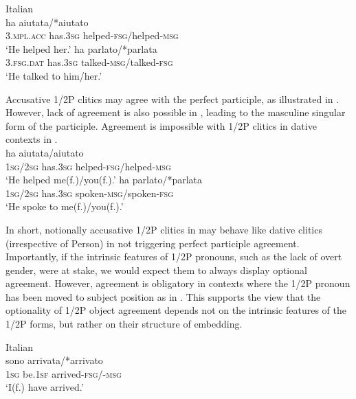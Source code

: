 \documentclass[output=paper,colorlinks,citecolor=brown,nonflat]{./langscibook}
\begin{document}
\ea%
    \label{ex:manzini:14}
    Italian\\
    \ea\label{ex:manzini:14a} 
         {ha}     {aiutata/*aiutato}\\
        \textsc{3.mpl.acc}  has.\textsc{3sg}    helped-\textsc{fsg/}helped\textsc{{}-msg}\\
    \glt ‘He helped her.’
    \ex\label{ex:manzini:14b} 
           {ha}     {parlato/*parlata}\\
        \textsc{3.fsg.dat}  has.\textsc{3sg}    talked-\textsc{msg/}talked\textsc{{}-fsg}\\
    \glt ‘He talked to him/her.’
    \z
\z
 
Accusative 1/2P clitics may agree with the perfect participle, as illustrated in . However, lack of agreement is also possible in , leading to the masculine singular form of the participle. Agreement is impossible with 1/2P clitics in dative contexts in .\\

\ea%
    \label{ex:manzini:15}
    \ea\label{ex:manzini:15a} 
         {ha}     {aiutata/aiutato}\\
        \textsc{1sg/2sg}  has\textsc{.3sg}    helped\textsc{{}-fsg/}helped\textsc{{}-msg}\\
    \glt ‘He helped me(f.)/you(f.).’
\ex\label{ex:manzini:15b} 
            {ha}     {parlato/*parlata}\\
        \textsc{1sg/2sg}  has\textsc{.3sg}    spoken\textsc{{}-msg/}spoken\textsc{{}-fsg}\\
    \glt ‘He spoke to me(f.)/you(f.).’
    \z
\z 

In short, notionally accusative 1/2P clitics in  may behave like dative clitics (irrespective of Person) in not triggering perfect participle agreement. Importantly, if the intrinsic features of 1/2P pronouns, such as the lack of overt gender, were at stake, we would expect them to always display optional agreement. However, agreement is obligatory in contexts where the 1/2P pronoun has been moved to subject position as in . This supports the view that the optionality of 1/2P object agreement depends not on the intrinsic features of the 1/2P forms, but rather on their structure of embedding.

\ea%
    \label{ex:manzini:16}
    Italian\\
      {sono}     {arrivata/*arrivato}\\
        \textsc{1sg}  be.\textsc{1sf}   arrived\textsc{{}-fsg/-msg}\\
    \glt ‘I(f.) have arrived.’
\z
\end{document}
